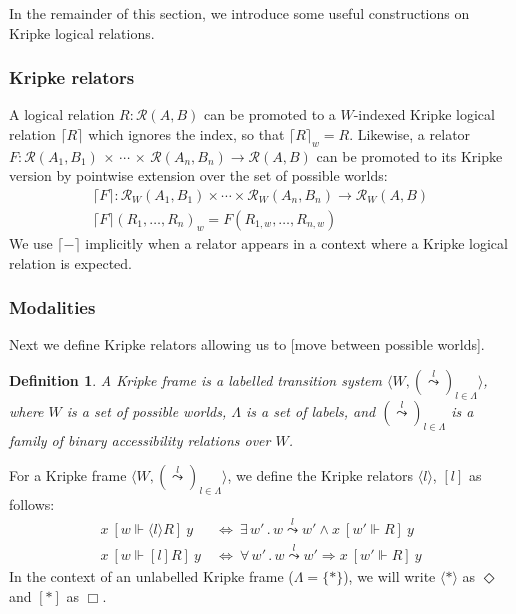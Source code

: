 \documentclass{article}
\newtheorem{definition}{Definition}
\newcommand{\ifr}[1]{\ [{#1}]\ }
\begin{document}
In the remainder of this section,
we introduce some useful constructions on
Kripke logical relations.

\subsubsection{Kripke relators}

A logical relation $R : \mathcal{R}(A, B)$
can be promoted to a $W$-indexed Kripke logical relation $\lceil R \rceil$
which ignores the index, so that $\lceil R \rceil_w = R$.
Likewise,
a relator
  $F : \mathcal{R}(A_1, B_1) \,\times\,\cdots\,\times\,\mathcal{R}(A_n, B_n) \rightarrow \mathcal{R}(A, B)$
can be promoted to its Kripke version
by pointwise extension over the set of possible worlds:
\begin{gather*}
  \lceil F \rceil : \mathcal{R}_W(A_1, B_1) \times \cdots \times \mathcal{R}_W(A_n, B_n) \rightarrow \mathcal{R}_W(A, B) \\
  \lceil F \rceil (R_1, \ldots, R_n)_w = F(R_{1,w}, \ldots, R_{n,w})
\end{gather*}
We use $\lceil - \rceil$ implicitly
when a relator appears in a context where
a Kripke logical relation is expected.

\subsubsection{Modalities}

Next we define Kripke relators
allowing us to [move between possible worlds].

\begin{definition}
A \emph{Kripke frame}
is a labelled transition system
$\langle W, (\stackrel{l}{\leadsto})_{l \in \Lambda} \rangle$, where
$W$ is a set of \emph{possible worlds},
$\Lambda$ is a set of labels, and
$(\stackrel{l}{\leadsto})_{l \in \Lambda}$ is a family of
binary \emph{accessibility relations} over $W$.
\end{definition}

For a Kripke frame
$\langle W, (\stackrel{l}{\leadsto})_{l \in \Lambda} \rangle$,
we define the Kripke relators $\langle l \rangle$, $[l]$ as follows:
\begin{align*}
  x \ifr{w \Vdash \langle l \rangle R} y & \: \Leftrightarrow \:
    \exists \, w' \,.\, w \stackrel{l}{\leadsto} w' \wedge
      x \ifr{w' \Vdash R} y \\
  x \ifr{w \Vdash [ l ] R} y & \: \Leftrightarrow \:
    \forall \, w' \,.\, w \stackrel{l}{\leadsto} w' \Rightarrow
      x \ifr{w' \Vdash R} y
\end{align*}
In the context of an unlabelled Kripke frame ($\Lambda = \{ * \}$),
we will write $\langle * \rangle$ as $\Diamond$ and
$[ * ]$ as $\Box$.
\end{document}
